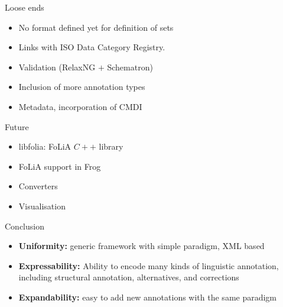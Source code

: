 \documentclass[compress]{beamer}
\begin{document}
\begin{frame}
    \begin{block}{Loose ends}
        \begin{itemize}
            \item No format defined yet for definition of sets
            \item Links with ISO Data Category Registry.
            \item Validation (RelaxNG $+$ Schematron)
            \item Inclusion of more annotation types            
            \item Metadata, incorporation of CMDI            
        \end{itemize}
    \end{block}
    
    \begin{block}{Future}
        \begin{itemize}
            \item libfolia: FoLiA $C++$ library
            \item FoLiA support in Frog
            \item Converters 
            \item Visualisation 
        \end{itemize}
    \end{block}

\end{frame}

\begin{frame}
    \begin{block}{Conclusion}
        \begin{itemize}
            \item \textbf{Uniformity:} generic framework with simple paradigm, XML based
            \item \textbf{Expressability:} Ability to encode many kinds of linguistic annotation, including structural annotation, alternatives, and corrections
            \item \textbf{Expandability:} easy to add new annotations with the same paradigm
        \end{itemize}
    \end{block}


    \smallraccoon

\end{frame}
\end{document}
